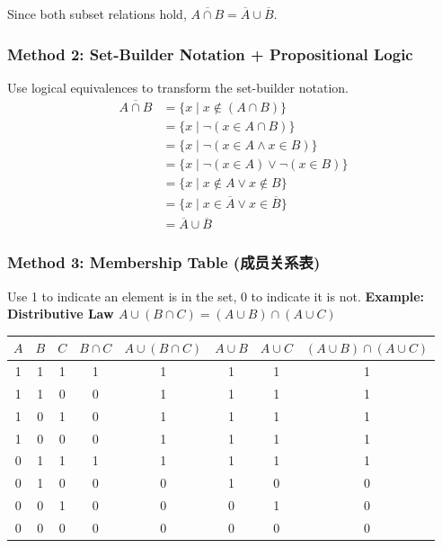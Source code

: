\documentclass[10pt,a4paper,openany]{ctexbook}
\theoremstyle{definition}
\theoremstyle{remark}
\begin{document}
Since both subset relations hold, $\overline{A \cap B} = \overline{A} \cup \overline{B}$.
\subsubsection{Method 2: Set-Builder Notation + Propositional Logic}

Use logical equivalences to transform the set-builder notation.
\[
\begin{aligned}
\overline{A \cap B} &= \{x \mid x \notin (A \cap B)\} \\
&= \{x \mid \lnot (x \in A \cap B)\} \\
&= \{x \mid \lnot (x \in A \land x \in B)\} \\
&= \{x \mid \lnot (x \in A) \lor \lnot (x \in B)\} \\
&= \{x \mid x \notin A \lor x \notin B\} \\
&= \{x \mid x \in \overline{A} \lor x \in \overline{B}\} \\
&= \overline{A} \cup \overline{B}
\end{aligned}
\]

\subsubsection{Method 3: Membership Table (成员关系表)}

Use 1 to indicate an element is in the set, 0 to indicate it is not.
\textbf{Example: Distributive Law $A \cup (B \cap C) = (A \cup B) \cap (A \cup C)$}
\begin{center}
\begin{tabular}{cccccccc}
\hline
$A$ & $B$ & $C$ & $B \cap C$ & $A \cup (B \cap C)$ & $A \cup B$ & $A \cup C$ & $(A \cup B) \cap (A \cup C)$ \\ \hline
1 & 1 & 1 & 1 & 1 & 1 & 1 & 1 \\
1 & 1 & 0 & 0 & 1 & 1 & 1 & 1 \\
1 & 0 & 1 & 0 & 1 & 1 & 1 & 1 \\
1 & 0 & 0 & 0 & 1 & 1 & 1 & 1 \\
0 & 1 & 1 & 1 & 1 & 1 & 1 & 1 \\
0 & 1 & 0 & 0 & 0 & 1 & 0 & 0 \\
0 & 0 & 1 & 0 & 0 & 0 & 1 & 0 \\
0 & 0 & 0 & 0 & 0 & 0 & 0 & 0 \\
\hline
\end{tabular}

\end{center}
\end{document}
